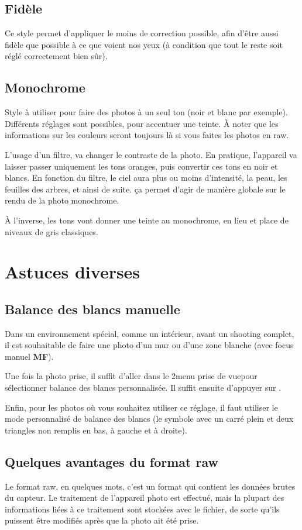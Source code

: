 \documentclass[a4paper,twoside]{article}
\begin{document}
\subsection{Fidèle}
Ce style permet d'appliquer le moins de correction possible, afin d'être aussi fidèle que possible à ce que voient nos yeux (à condition que tout le reste soit réglé correctement bien sûr).

\subsection{Monochrome}
Style à utiliser pour faire des photos à un seul ton (noir et blanc par exemple). Différents réglages sont possibles, pour accentuer une teinte. À noter que les informations sur les couleurs seront toujours là si vous faites les photos en raw.

L'usage d'un filtre, va changer le contraste de la photo. En pratique, l'appareil va laisser passer uniquement les tons oranges, puis convertir ces tons en noir et blancs. En fonction du filtre, le ciel aura plus ou moins d'intensité, la peau, les feuilles des arbres, et ainsi de suite. ça permet d'agir de manière globale sur le rendu de la photo monochrome. 

À l'inverse, les tons vont donner une teinte au monochrome, en lieu et place de niveaux de gris classiques.


\section{Astuces diverses}
\subsection{Balance des blancs manuelle}
Dans un environnement spécial, comme un intérieur, avant un shooting complet, il est souhaitable de faire une photo d'un mur ou d'une zone blanche (avec focus manuel \textbf{MF}). 

Une fois la photo prise, il suffit d'aller dans le 2\ieme menu \og prise de vue\fg pour sélectionner \og balance des blancs personnalisée\fg. Il suffit ensuite d'appuyer sur . 

Enfin, pour les photos où vous souhaitez utiliser ce réglage, il faut utiliser le mode personnalisé de balance des blancs (le symbole avec un carré plein et deux triangles non remplis en bas, à gauche et à droite).

\subsection{Quelques avantages du format raw}
Le format raw, en quelques mots, c'est un format qui contient les données brutes du capteur. Le traitement de l'appareil photo est effectué, mais la plupart des informations liées à ce traitement sont stockées avec le fichier, de sorte qu'ils puissent être modifiés après que la photo ait été prise. 
\end{document}
